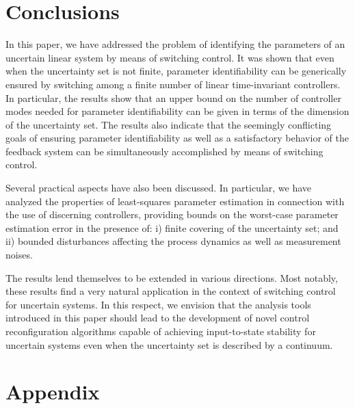 \documentclass[letterpaper, 10 pt, conference]{ieeetran}
\begin{document}
\section{Conclusions}

In this paper, we have addressed the problem of identifying the parameters of an uncertain 
linear system by means of switching control. 
It was shown that even when the uncertainty set is not finite, 
parameter identifiability can be generically ensured by 
switching among a finite number of linear time-invariant controllers. 
In particular, the results show that an upper bound on the number of controller modes needed for parameter identifiability can be given in terms of the dimension of the uncertainty set. 
The results also indicate that
the seemingly conflicting goals of ensuring parameter identifiability as well as a satisfactory behavior of the feedback system can be simultaneously accomplished by means of switching control. 

Several practical aspects have also been discussed. In particular, 
we have analyzed the properties of 
least-squares parameter estimation in connection with the use of discerning controllers,
providing bounds on the worst-case parameter estimation error
in the presence of: i) finite covering of the uncertainty set; and 
ii) bounded disturbances affecting the process dynamics as well as measurement noises. 
 
The results lend themselves to be extended in various directions.
Most notably, these results find a very natural application
in the context of switching control for uncertain systems. In this respect, 
we envision that the analysis tools introduced in this paper should 
lead to the development of novel control reconfiguration
algorithms capable of achieving input-to-state stability 
for uncertain systems even when the uncertainty set is described 
by a continuum.

\section*{Appendix}
\end{document}
